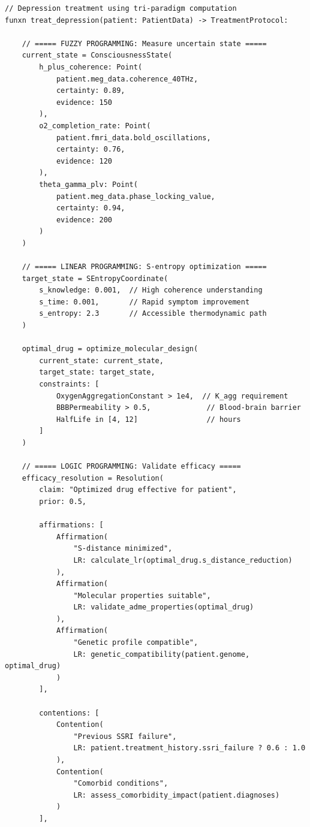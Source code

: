\begin{verbatim}
// Depression treatment using tri-paradigm computation
funxn treat_depression(patient: PatientData) -> TreatmentProtocol:

    // ===== FUZZY PROGRAMMING: Measure uncertain state =====
    current_state = ConsciousnessState(
        h_plus_coherence: Point(
            patient.meg_data.coherence_40THz,
            certainty: 0.89,
            evidence: 150
        ),
        o2_completion_rate: Point(
            patient.fmri_data.bold_oscillations,
            certainty: 0.76,
            evidence: 120
        ),
        theta_gamma_plv: Point(
            patient.meg_data.phase_locking_value,
            certainty: 0.94,
            evidence: 200
        )
    )

    // ===== LINEAR PROGRAMMING: S-entropy optimization =====
    target_state = SEntropyCoordinate(
        s_knowledge: 0.001,  // High coherence understanding
        s_time: 0.001,       // Rapid symptom improvement
        s_entropy: 2.3       // Accessible thermodynamic path
    )

    optimal_drug = optimize_molecular_design(
        current_state: current_state,
        target_state: target_state,
        constraints: [
            OxygenAggregationConstant > 1e4,  // K_agg requirement
            BBBPermeability > 0.5,             // Blood-brain barrier
            HalfLife in [4, 12]                // hours
        ]
    )

    // ===== LOGIC PROGRAMMING: Validate efficacy =====
    efficacy_resolution = Resolution(
        claim: "Optimized drug effective for patient",
        prior: 0.5,

        affirmations: [
            Affirmation(
                "S-distance minimized",
                LR: calculate_lr(optimal_drug.s_distance_reduction)
            ),
            Affirmation(
                "Molecular properties suitable",
                LR: validate_adme_properties(optimal_drug)
            ),
            Affirmation(
                "Genetic profile compatible",
                LR: genetic_compatibility(patient.genome, optimal_drug)
            )
        ],

        contentions: [
            Contention(
                "Previous SSRI failure",
                LR: patient.treatment_history.ssri_failure ? 0.6 : 1.0
            ),
            Contention(
                "Comorbid conditions",
                LR: assess_comorbidity_impact(patient.diagnoses)
            )
        ],


\end{verbatim}
